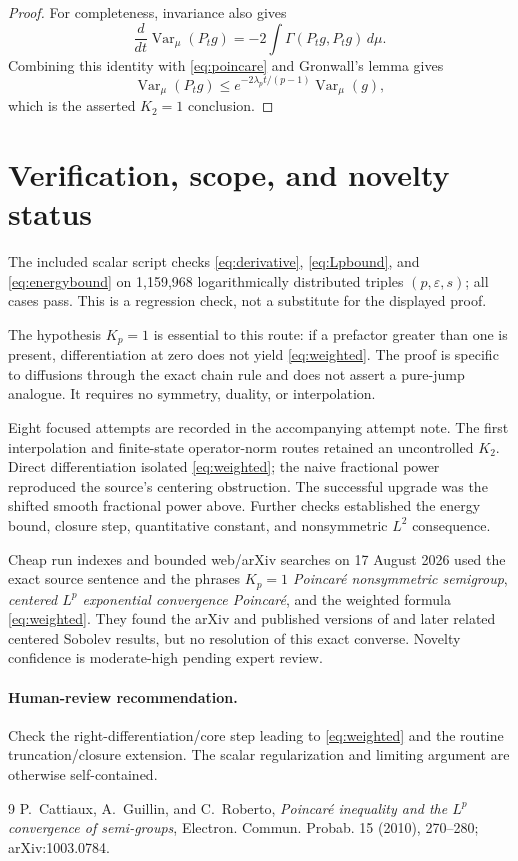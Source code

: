 \documentclass[11pt]{article}
\newcommand{\Var}{\operatorname{Var}_{\mu}}
\begin{document}
\begin{proof}
For completeness, invariance also gives
\[
 \frac{d}{dt}\Var(P_tg)
 =-2\int\Gamma(P_tg,P_tg)\,d\mu.
\]
Combining this identity with \eqref{eq:poincare} and Gronwall's lemma gives
\[
 \Var(P_tg)\le
 e^{-2\lambda_p t/(p-1)}\Var(g),
\]
which is the asserted $K_2=1$ conclusion.
\end{proof}

\section*{Verification, scope, and novelty status}

The included scalar script checks \eqref{eq:derivative},
\eqref{eq:Lpbound}, and \eqref{eq:energybound} on 1,159,968 logarithmically
distributed triples $(p,\varepsilon,s)$; all cases pass.  This is a regression
check, not a substitute for the displayed proof.

The hypothesis $K_p=1$ is essential to this route: if a prefactor greater
than one is present, differentiation at zero does not yield
\eqref{eq:weighted}.  The proof is specific to diffusions through the exact
chain rule and does not assert a pure-jump analogue.  It requires no symmetry,
duality, or interpolation.

Eight focused attempts are recorded in the accompanying attempt note.  The
first interpolation and finite-state operator-norm routes retained an
uncontrolled $K_2$.  Direct differentiation isolated \eqref{eq:weighted}; the
naive fractional power reproduced the source's centering obstruction.  The
successful upgrade was the shifted smooth fractional power above.  Further
checks established the energy bound, closure step, quantitative constant,
and nonsymmetric $L^2$ consequence.

Cheap run indexes and bounded web/arXiv searches on 17 August 2026 used the
exact source sentence and the phrases \emph{$K_p=1$ Poincar\'e nonsymmetric
semigroup}, \emph{centered $L^p$ exponential convergence Poincar\'e}, and the
weighted formula \eqref{eq:weighted}.  They found the arXiv and published
versions of \cite{CGR} and later related centered Sobolev results, but no
resolution of this exact converse.  Novelty confidence is moderate-high
pending expert review.

\paragraph{Human-review recommendation.}
Check the right-differentiation/core step leading to \eqref{eq:weighted} and
the routine truncation/closure extension.  The scalar regularization and
limiting argument are otherwise self-contained.

\begin{thebibliography}{9}
P.~Cattiaux, A.~Guillin, and C.~Roberto,
\emph{Poincar\'e inequality and the $L^p$ convergence of semi-groups},
Electron. Commun. Probab. 15 (2010), 270--280; arXiv:1003.0784.
\end{thebibliography}
\end{document}
